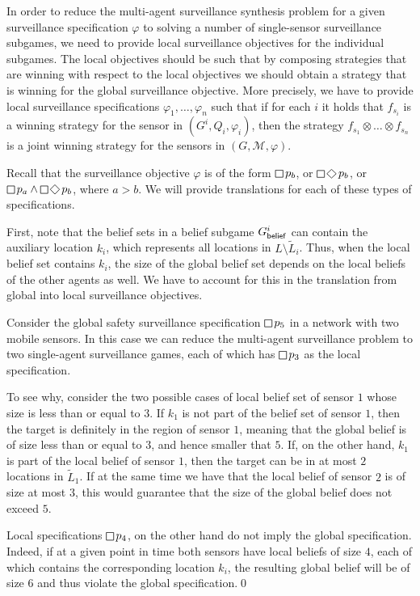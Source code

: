 In order to reduce the multi-agent surveillance synthesis problem for a given surveillance specification $\varphi$ to solving a number of single-sensor surveillance subgames, we need to provide local surveillance objectives for the individual subgames. The local objectives should be such that by composing strategies that are winning with respect to the local objectives we should obtain a strategy that is winning for the global surveillance objective. More precisely, we have to provide local surveillance specifications $\varphi_1,\ldots,\varphi_n$ such that if for each $i$ it holds that $f_{s_i}$ is  a winning strategy for the sensor in $(G^i,Q_i,\varphi_i)$, then the strategy $f_{s_1}\otimes \ldots \otimes f_{s_n}$ is  a joint winning strategy for the sensors in $(G,\mathcal M,\varphi)$.

Recall that the surveillance objective $\varphi$ is of the form $\LTLglobally p_b$, or $\LTLglobally\LTLfinally p_b$, or $\LTLglobally p_a \wedge \LTLglobally\LTLfinally p_b$, where $a > b$. We will provide translations for each of these types of  specifications.

First, note that the belief sets in a belief subgame $G^i_{\mathsf{belief}}$ can contain the auxiliary location $k_i$, which represents all locations in $L \setminus \widetilde L_i$. Thus, when the local belief set contains $k_i$, the size of the global belief set depends on the local beliefs of the other agents as well. We have to account for this in the translation from global into local surveillance objectives.

\begin{example}\label{ex:global-local-safety}
Consider the global safety surveillance specification $\LTLglobally p_5$ in a network with two mobile sensors. In this case we can reduce the multi-agent surveillance problem to two single-agent surveillance games, each of which has $\LTLglobally p_3$ as the local specification. 

To see why, consider the two possible cases of local belief set of sensor $1$ whose size is less than or equal to $3$. If $k_1$ is not part of the belief set of sensor $1$, then the target is definitely in the region of sensor $1$, meaning that the global belief is of size less than or equal to $3$, and hence smaller that $5$. If, on the other hand, $k_1$ is part of the local belief of sensor $1$, then the target can be in at most $2$ locations in $\widetilde L_1$. If at the same time we have that the local belief of sensor $2$ is of size at most $3$, this would guarantee that the size of the global belief does not exceed $5$. 

Local specifications $\LTLglobally p_4$, on the other hand do not imply the global specification. Indeed, if at a given point in time both sensors have local beliefs of size $4$, each of which contains the corresponding location $k_i$, the resulting global belief will be of size $6$ and thus violate the global specification.\qed
\end{example}

